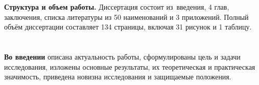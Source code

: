 
\textbf{Структура и объем работы.} Диссертация состоит из~введения, 4 глав, заключения, списка литературы из 50 наименований и 3 приложений. Полный объём диссертации составляет 134 страницы, включая 31 рисунок и 1 таблицу.
%




\section*{}

\textbf{Во введении} описана актуальность работы, сформулированы цель и задачи исследования, изложены основные результаты, их теоретическая и практическая значимость, приведена новизна исследования и защищаемые положения. 


